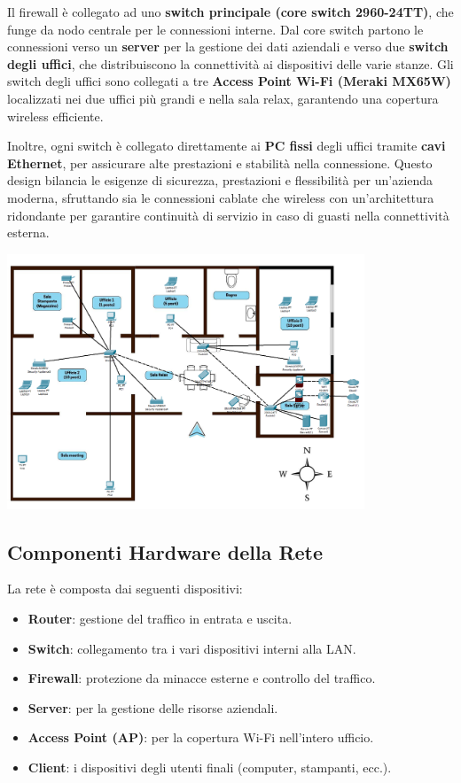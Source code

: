 \documentclass{assignment}
\begin{document}
Il firewall è collegato ad uno \textbf{switch principale (core switch 2960-24TT)}, che funge da nodo centrale per le connessioni interne. Dal core switch partono le connessioni verso un \textbf{server} per la gestione dei dati aziendali e verso due \textbf{switch degli uffici}, che distribuiscono la connettività ai dispositivi delle varie stanze. Gli switch degli uffici sono collegati a tre \textbf{Access Point Wi-Fi (Meraki MX65W)} localizzati nei due uffici più grandi e nella sala relax, garantendo una copertura wireless efficiente. 

Inoltre, ogni switch è collegato direttamente ai \textbf{PC fissi} degli uffici tramite \textbf{cavi Ethernet}, per assicurare alte prestazioni e stabilità nella connessione. Questo design bilancia le esigenze di sicurezza, prestazioni e flessibilità per un'azienda moderna, sfruttando sia le connessioni cablate che wireless con un'architettura ridondante per garantire continuità di servizio in caso di guasti nella connettività esterna.


\begin{center}
    \includegraphics[width=0.8\textwidth]{assets/FloorPlanConDevice.png}
    \end{center}

\subsection{Componenti Hardware della Rete}
La rete è composta dai seguenti dispositivi:

\begin{itemize}
    \item \textbf{Router}: gestione del traffico in entrata e uscita.
    \item \textbf{Switch}: collegamento tra i vari dispositivi interni alla LAN.
    \item \textbf{Firewall}: protezione da minacce esterne e controllo del traffico.
    \item \textbf{Server}: per la gestione delle risorse aziendali.
    \item \textbf{Access Point (AP)}: per la copertura Wi-Fi nell'intero ufficio.
    \item \textbf{Client}: i dispositivi degli utenti finali (computer, stampanti, ecc.).
\end{itemize}
\end{document}
